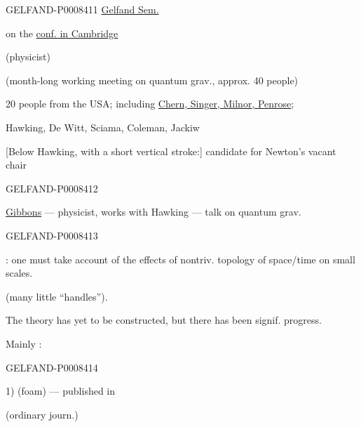 \begin{GelfandAdjacentEvidence}{GELFAND-P000841}{1}
\qquad \uline{Gelfand Sem.}

 on the \uline{conf. in Cambridge}

(physicist)

(month-long working meeting on quantum grav., approx. 40 people)

20 people from the USA; including \uline{Chern, Singer, Milnor, Penrose};

Hawking, De Witt, Sciama, Coleman, Jackiw

[Below Hawking, with a short vertical stroke:] candidate for Newton’s vacant chair
\end{GelfandAdjacentEvidence}
\begin{GelfandAdjacentEvidence}{GELFAND-P000841}{2}


\uline{Gibbons} — physicist, works with Hawking — talk on quantum grav.
\end{GelfandAdjacentEvidence}
\begin{GelfandAdjacentEvidence}{GELFAND-P000841}{3}


: one must take account of the effects of nontriv. topology of space/time on small scales.

(many little “handles”).

The theory has yet to be constructed, but there has been signif. progress.

Mainly :
\end{GelfandAdjacentEvidence}
\begin{GelfandAdjacentEvidence}{GELFAND-P000841}{4}


1)  (foam) — published in 

(ordinary journ.)
\end{GelfandAdjacentEvidence}
